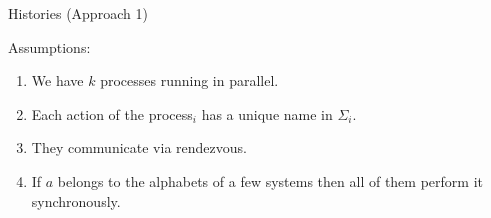 \documentclass[t,11pt]{beamer}
\begin{document}




\begin{frame}{Histories (Approach 1)}
\begin{block}{Assumptions:}
\begin{enumerate}
 \item We have $k$ processes running in parallel. 
 \item Each action of the process$_i$ has a unique name in $\Sigma_i$.
 \item They communicate via rendezvous.
 \item If $a$ belongs to the alphabets of a few systems then all
 of them perform it synchronously.  
\end{enumerate}
\end{block}



\end{frame}
\end{document}
